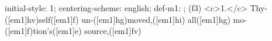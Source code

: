 initial-style: 1;
centering-scheme: english;
def-m1: \grealign;
(f3) <c>1.</c> Thy-([em1]hv)self([em1]f) un-([em1]hg)moved,([em1]hi) all([em1]hg) mo-([em1]f)tion's([em1]e) source,([em1]fv)